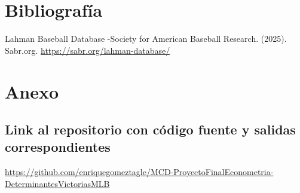 \documentclass[man,floatsintext]{apa7}
\begin{document}
\section{Bibliografía}
Lahman Baseball Database -Society for American Baseball Research. (2025). Sabr.org. \url{https://sabr.org/lahman-database/}
\section{Anexo}
\subsection{Link al repositorio con código fuente y salidas correspondientes}
\url{https://github.com/enriquegomeztagle/MCD-ProyectoFinalEconometria-DeterminantesVictoriasMLB}
\end{document}
